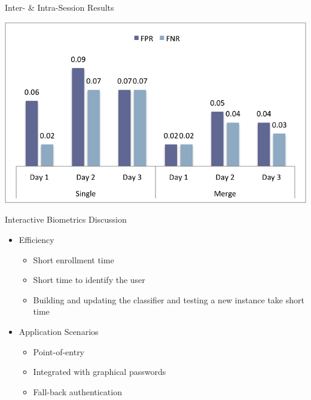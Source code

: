 \begin{frame}{Inter- \& Intra-Session Results}
%
\begin{center}
\includegraphics[width=0.9\linewidth]{Figures/result1}
\end{center}

\end{frame}





\begin{frame}{Interactive Biometrics Discussion}

\begin{itemize}
\item Efficiency
\begin{itemize}
\item Short enrollment time
\item Short time to identify the user
\item Building and updating the classifier and testing a new instance take short time
\end{itemize}

\item{Application Scenarios}
\begin{itemize}
\item Point-of-entry
\item Integrated with graphical passwords
\item Fall-back authentication
\end{itemize}

\end{itemize}

\end{frame}


